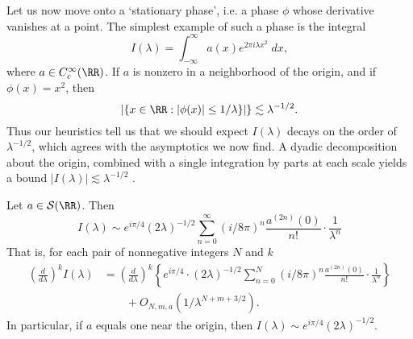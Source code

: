 Let us now move onto a `stationary phase', i.e. a phase $\phi$ whose derivative vanishes at a point. The simplest example of such a phase is the integral
%
\[ I(\lambda) = \int_{-\infty}^\infty a(x) e^{2 \pi i \lambda x^2}\; dx, \]
%
where $a \in C_c^\infty(\RR)$. If $a$   is nonzero in a neighborhood of the origin, and if $\phi(x) = x^2$, then
%
\[ |\{ x \in \RR : |\phi(x)| \leq 1/\lambda \}| \} \lesssim \lambda^{-1/2}. \]
%
Thus our heuristics tell us that we should expect $I(\lambda)$ decays on the order of $\lambda^{-1/2}$, which agrees with the asymptotics we now find. A dyadic decomposition about the origin, combined with a single integration by parts at each scale yields a bound $|I(\lambda)| \lesssim \lambda^{-1/2}$
.
\begin{theorem}
  Let $a \in \mathcal{S}(\RR)$. Then
  \[ I(\lambda) \sim e^{i \pi / 4} (2\lambda)^{-1/2} \sum_{n = 0}^\infty \left( i / 8 \pi \right)^n \frac{a^{(2n)}(0)}{n!} \cdot \frac{1}{\lambda^n} \]
  That is, for each pair of nonnegative integers $N$ and $k$
  \begin{align*}
    \left( \frac{d}{d\lambda} \right)^k I(\lambda) &= \left( \frac{d}{d\lambda} \right)^k \left\{ e^{i \pi / 4} \cdot (2\lambda)^{-1/2} \sum_{n = 0}^N \left( i / 8 \pi \right)^n \frac{a^{(2n)}(0)}{n!} \cdot \frac{1}{\lambda^n} \right\}\\
    &\quad\quad + O_{N,m,a}(1/\lambda^{N + m + 3/2}).
  \end{align*}
  In particular, if $a$ equals one near the origin, then $I(\lambda) \sim e^{i \pi / 4} (2 \lambda)^{-1/2}$.
\end{theorem}

